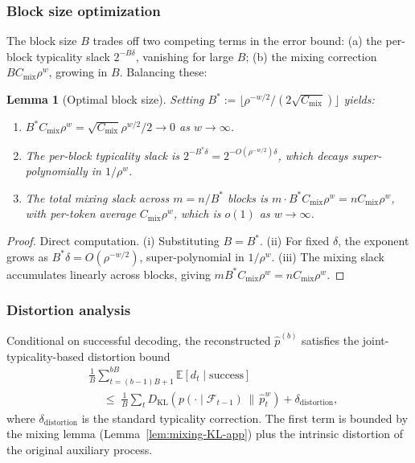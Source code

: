 \documentclass[11pt]{article}
\newcommand{\E}{\mathbb{E}}
\newcommand{\F}{\mathcal{F}}
\newcommand{\KL}[2]{D_{\mathrm{KL}}(#1 \,\|\, #2)}
\theoremstyle{plain}
\newtheorem{lemma}[theorem]{Lemma}
\theoremstyle{definition}
\theoremstyle{remark}
\begin{document}
\subsubsection{Block size optimization}\label{app:Bopt}

The block size $B$ trades off two competing terms in the error bound:
(a) the per-block typicality slack $2^{-B\delta}$, vanishing for large
$B$; (b) the mixing correction $B C_{\mathrm{mix}}\rho^w$, growing in
$B$. Balancing these:

\begin{lemma}[Optimal block size]\label{lem:Bopt}
Setting $B^* := \lfloor \rho^{-w/2}/(2\sqrt{C_{\mathrm{mix}}}) \rfloor$
yields:
\begin{enumerate}[label=\textup{(\roman*)}, leftmargin=*]
\item $B^* C_{\mathrm{mix}}\rho^w = \sqrt{C_{\mathrm{mix}}}\rho^{w/2}/2 \to 0$ as $w \to \infty$.
\item The per-block typicality slack is $2^{-B^*\delta} = 2^{-O(\rho^{-w/2})\delta}$,
which decays super-polynomially in $1/\rho^w$.
\item The total mixing slack across $m = n/B^*$ blocks is
$m \cdot B^* C_{\mathrm{mix}}\rho^w = n C_{\mathrm{mix}}\rho^w$, with
per-token average $C_{\mathrm{mix}}\rho^w$, which is $o(1)$ as $w \to \infty$.
\end{enumerate}
\end{lemma}

\begin{proof}
Direct computation. (i) Substituting $B = B^*$.
(ii) For fixed $\delta$, the exponent grows as
$B^*\delta = O(\rho^{-w/2})$, super-polynomial in $1/\rho^w$.
(iii) The mixing slack accumulates linearly across blocks, giving
$m B^* C_{\mathrm{mix}}\rho^w = n C_{\mathrm{mix}}\rho^w$.
\end{proof}

\subsubsection{Distortion analysis}

Conditional on successful decoding, the reconstructed $\hat p^{(b)}$
satisfies the joint-typicality-based distortion bound
\[
\begin{split}
&\frac{1}{B} \sum_{t=(b-1)B+1}^{bB} \E[d_t \mid \text{success}]\\
&\quad\;\leq\;
\frac{1}{B} \sum_{t} \KL{p(\cdot \mid \F_{t-1})}{\hat p_t^{w}} + \delta_{\mathrm{distortion}},
\end{split}
\]
where $\delta_{\mathrm{distortion}}$ is the standard typicality
correction. The first term is bounded by the mixing lemma
(Lemma~\ref{lem:mixing-KL-app}) plus the intrinsic distortion of
the original auxiliary process.
\end{document}

